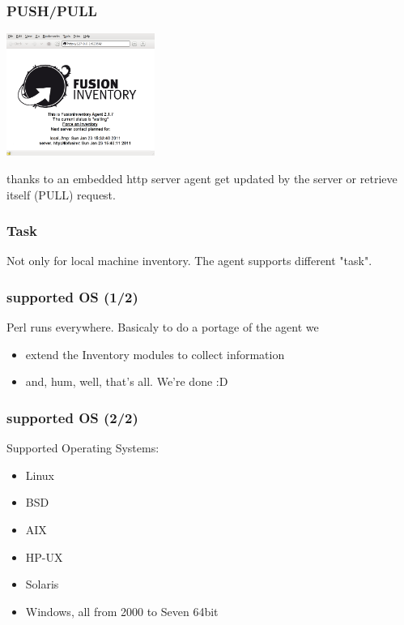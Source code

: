 \begin{frame}
    \frametitle{PUSH/PULL}
    \includegraphics[height=4.0cm]{pics/http-server.png}

    thanks to an embedded http server agent get updated by the server or retrieve itself (PULL) request.
\end{frame}

\begin{frame}
    \frametitle{Task}
    Not only for local machine inventory. The agent supports different "task".
\end{frame}

\begin{frame}
    \frametitle{supported OS (1/2)}
    Perl runs everywhere.
    \pause
    Basicaly to do a portage of the agent we
    \begin{itemize}
        \item extend the Inventory modules to collect information
        \item and, hum, well, that's all. We're done :D
    \end{itemize}
\end{frame}

\begin{frame}
    \frametitle{supported OS (2/2)}
    Supported Operating Systems:
    \begin{itemize}
        \item<2-> Linux
        \item<3-> BSD
        \item<4-> AIX
        \item<5-> HP-UX
        \item<6-> Solaris
        \item<7-> Windows, all from 2000 to Seven 64bit
    \end{itemize}
\end{frame}
 
